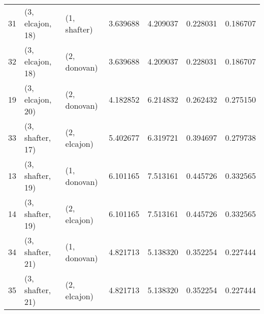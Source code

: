 \begin{tabular}{lllrrrr}
31 &  (3, elcajon, 18) &     (1, shafter) &  3.639688 &  4.209037 &   0.228031 &  0.186707 \\
32 &  (3, elcajon, 18) &     (2, donovan) &  3.639688 &  4.209037 &   0.228031 &  0.186707 \\
19 &  (3, elcajon, 20) &     (2, donovan) &  4.182852 &  6.214832 &   0.262432 &  0.275150 \\
33 &  (3, shafter, 17) &     (2, elcajon) &  5.402677 &  6.319721 &   0.394697 &  0.279738 \\
13 &  (3, shafter, 19) &     (1, donovan) &  6.101165 &  7.513161 &   0.445726 &  0.332565 \\
14 &  (3, shafter, 19) &     (2, elcajon) &  6.101165 &  7.513161 &   0.445726 &  0.332565 \\
34 &  (3, shafter, 21) &     (1, donovan) &  4.821713 &  5.138320 &   0.352254 &  0.227444 \\
35 &  (3, shafter, 21) &     (2, elcajon) &  4.821713 &  5.138320 &   0.352254 &  0.227444 \\
\bottomrule
\end{tabular}
